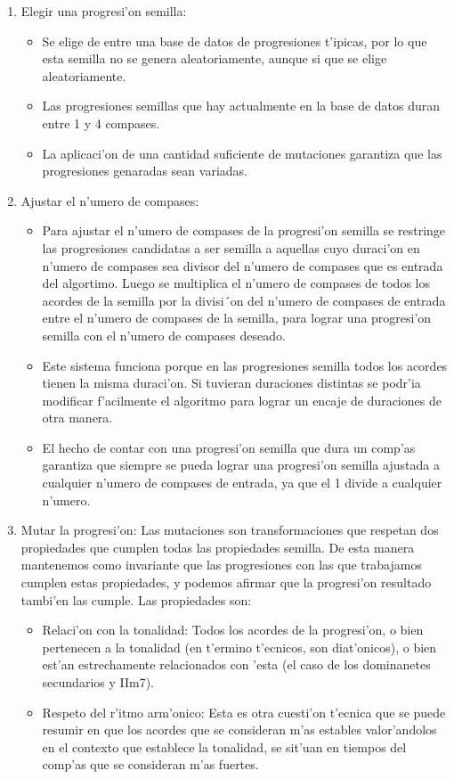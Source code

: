 \begin{enumerate}
\item Elegir una progresi'on semilla: 
        \begin{itemize}
        \item Se elige de entre una base de datos de progresiones t'ipicas, por lo que esta semilla no se genera aleatoriamente, aunque si que se elige aleatoriamente.
        \item Las progresiones semillas que hay actualmente en la base de datos duran entre 1 y 4 compases.
        \item La aplicaci'on de una cantidad suficiente de mutaciones garantiza que las progresiones genaradas sean variadas.
        \end{itemize}       
\item Ajustar el n'umero de compases:
        \begin{itemize}
        \item Para ajustar el n'umero de compases de la progresi'on semilla se restringe las progresiones candidatas a ser semilla a aquellas cuyo duraci'on en n'umero de compases sea divisor del n'umero de compases que es entrada del algortimo. Luego se multiplica el n'umero de compases de todos los acordes de la semilla por la divisi´on del n'umero de compases de entrada entre el n'umero de compases de la semilla, para lograr una progresi'on semilla con el n'umero de compases deseado.
        \item Este sistema funciona porque en las progresiones semilla todos los acordes tienen la misma duraci'on. Si tuvieran duraciones distintas se podr'ia modificar f'acilmente el algoritmo para lograr un encaje de duraciones de otra manera.
        \item El hecho de contar con una progresi'on semilla que dura un comp'as garantiza que siempre se pueda lograr una progresi'on semilla ajustada a cualquier n'umero de compases de entrada, ya que el 1 divide a cualquier n'umero.
        \end{itemize}       
\item Mutar la progresi'on: Las mutaciones son transformaciones que respetan dos propiedades que cumplen todas las propiedades semilla. De esta manera mantenemos como invariante que las progresiones con las que trabajamos cumplen estas propiedades, y podemos afirmar que la progresi'on resultado tambi'en las cumple. Las propiedades son:

        \begin{itemize}
        \item Relaci'on con la tonalidad: Todos los acordes de la progresi'on, o bien pertenecen a la tonalidad (en t'ermino t'ecnicos, son diat'onicos), o bien est'an estrechamente relacionados con 'esta (el caso de los dominanetes secundarios y IIm7). 
        \item Respeto del r'itmo arm'onico: Esta es otra cuesti'on t'ecnica que se puede resumir en que los acordes que se consideran m'as estables valor'andolos en el contexto que establece la tonalidad, se sit'uan en tiempos del comp'as que se consideran m'as fuertes.
        \end{itemize}


\end{enumerate}
